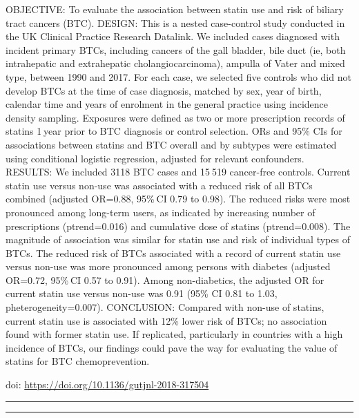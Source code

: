 \documentclass[]{article}
\begin{document}
OBJECTIVE: To evaluate the association between statin use and risk of
biliary tract cancers (BTC). DESIGN: This is a nested case-control study
conducted in the UK Clinical Practice Research Datalink. We included
cases diagnosed with incident primary BTCs, including cancers of the
gall bladder, bile duct (ie, both intrahepatic and extrahepatic
cholangiocarcinoma), ampulla of Vater and mixed type, between 1990 and
2017. For each case, we selected five controls who did not develop BTCs
at the time of case diagnosis, matched by sex, year of birth, calendar
time and years of enrolment in the general practice using incidence
density sampling. Exposures were defined as two or more prescription
records of statins 1 year prior to BTC diagnosis or control selection.
ORs and 95\% CIs for associations between statins and BTC overall and by
subtypes were estimated using conditional logistic regression, adjusted
for relevant confounders. RESULTS: We included 3118 BTC cases and 15 519
cancer-free controls. Current statin use versus non-use was associated
with a reduced risk of all BTCs combined (adjusted OR=0.88, 95\% CI 0.79
to 0.98). The reduced risks were most pronounced among long-term users,
as indicated by increasing number of prescriptions (ptrend=0.016) and
cumulative dose of statins (ptrend=0.008). The magnitude of association
was similar for statin use and risk of individual types of BTCs. The
reduced risk of BTCs associated with a record of current statin use
versus non-use was more pronounced among persons with diabetes (adjusted
OR=0.72, 95\% CI 0.57 to 0.91). Among non-diabetics, the adjusted OR for
current statin use versus non-use was 0.91 (95\% CI 0.81 to 1.03,
pheterogeneity=0.007). CONCLUSION: Compared with non-use of statins,
current statin use is associated with 12\% lower risk of BTCs; no
association found with former statin use. If replicated, particularly in
countries with a high incidence of BTCs, our findings could pave the way
for evaluating the value of statins for BTC chemoprevention.

doi: \url{https://doi.org/10.1136/gutjnl-2018-317504}

{}

{}

\begin{center}\rule{0.5\linewidth}{\linethickness}\end{center}

\begin{center}\rule{0.5\linewidth}{\linethickness}\end{center}
\end{document}
